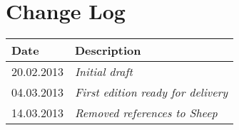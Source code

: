 \section{Change Log}
\label{sec:changelog}
\begin{tabular}{|l|l|}
\hline
Date & Description \\ \hline
20.02.2013 & \emph{Initial draft\/} \\ \hline
04.03.2013 & \emph{First edition ready for delivery\/} \\ \hline
14.03.2013 & \emph{Removed references to Sheep\/} \\ \hline
\end{tabular}
